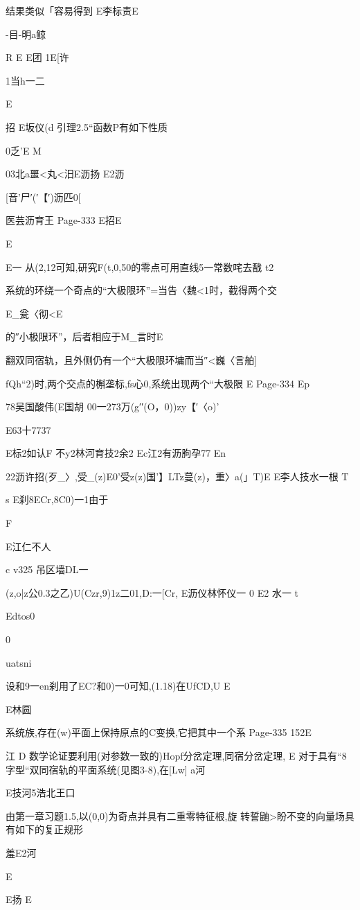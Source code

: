 {{{{{{{{{{{{{{{{{{{结果类似「容易得到
E李标责E

-目-明a鲸

R
E
E团
1E[许

1当h一二

E

招
E坂仪(d
引理2.5“函数P有如下性质

0乏'E
M

03北a噩<丸<汨E沥扬
E2沥

[音'尸′(′【′)沥匹0[

医芸沥育王
Page-333
E招E

E

E一
从(2,12可知,研究F(t,0,50的零点可用直线5一常数咤去戬
t2

系统的环绕一个奇点的“大极限环”=当告〈魏<1时，截得两个交

E_瓮〈彻<E

的″小极限环”，后者相应于M_言时E

翻双同宿轨，且外侧仍有一个“大极限环墉而当″<巍〈言舶]

fQh“2)时,两个交点的槲垄标,fs心0,系统出现两个“大极限
E
Page-334
Ep

78吴国酸伟(E国胡
00一273万(g′′(O，0))zy【′〈o)'

E63十7737

E标2如认F
不y2林河育技2余2
Ec江2有沥朐孕77
En

22沥许招(歹_〉,受_(z)E0'受z(z)国'】LTz蔓(z)，重〉a(」T)E
E李人技水一根
T

s
E刹8ECr,8C0)一1由于

F

E江仁不人

c
v325
吊区墙DL一{(z,o|z公0.3之乙)U(Czr,9)1z二01,D:一[Cr,
E沥仪林怀仪一
0
E2
水一
t

Edtos0

0

uatsni

设和9一en刹用了EC?和0)一0可知,(1.18)在UfCD,U
E

E林圆

系统族,存在(w)平面上保持原点的C变换,它把其中一个系
Page-335
152E

江
D
数学论证要利用(对参数一致的)Hopf分岔定理,同宿分岔定理,
E
对于具有“8字型“双同宿轨的平面系统(见图3-8),在[Lw]
a河

E技河5浩北王口

由第一章习题1.5,以(0,0)为奇点并具有二重零特征根,旋
转誓鼬>盼不变的向量场具有如下的复正规形

羞E2河

E

E扬
E

}}}}}}}}}}}}}}}}}}}}
